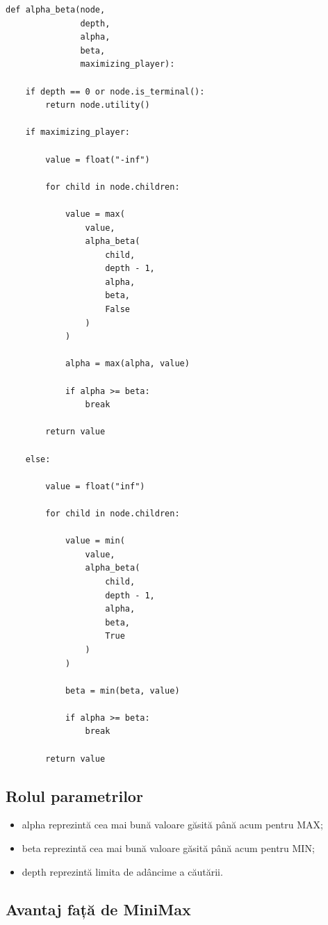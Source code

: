 \documentclass[12pt,a4paper]{article}
\begin{document}
\begin{verbatim}
def alpha_beta(node,
               depth,
               alpha,
               beta,
               maximizing_player):

    if depth == 0 or node.is_terminal():
        return node.utility()

    if maximizing_player:

        value = float("-inf")

        for child in node.children:

            value = max(
                value,
                alpha_beta(
                    child,
                    depth - 1,
                    alpha,
                    beta,
                    False
                )
            )

            alpha = max(alpha, value)

            if alpha >= beta:
                break

        return value

    else:

        value = float("inf")

        for child in node.children:

            value = min(
                value,
                alpha_beta(
                    child,
                    depth - 1,
                    alpha,
                    beta,
                    True
                )
            )

            beta = min(beta, value)

            if alpha >= beta:
                break

        return value
\end{verbatim}

\subsection{Rolul parametrilor}

\begin{itemize}
\item alpha reprezintă cea mai bună valoare găsită până acum pentru MAX;
\item beta reprezintă cea mai bună valoare găsită până acum pentru MIN;
\item depth reprezintă limita de adâncime a căutării.
\end{itemize}

\subsection{Avantaj față de MiniMax}
\end{document}
